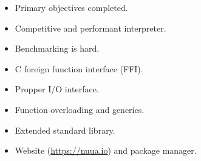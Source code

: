 \begin{slide}
    \begin{itemize}
        \item Primary objectives completed.
        \item Competitive and performant interpreter.
        \item Benchmarking is hard.
    \end{itemize}
    \begin{itemize}
        \item C foreign function interface (FFI).
        \item Propper I/O interface.
        \item Function overloading and generics.
        \item Extended standard library.
        \item Website (\url{https://nuua.io}) and package manager.
    \end{itemize}
\end{slide}
